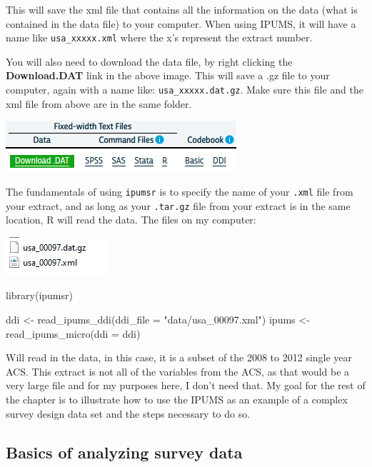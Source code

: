 \documentclass[
]{article}
\newenvironment{Shaded}{\begin{snugshade}}{\end{snugshade}}
\newcommand{\AttributeTok}[1]{\textcolor[rgb]{0.77,0.63,0.00}{#1}}
\newcommand{\FunctionTok}[1]{\textcolor[rgb]{0.00,0.00,0.00}{#1}}
\newcommand{\NormalTok}[1]{#1}
\newcommand{\OtherTok}[1]{\textcolor[rgb]{0.56,0.35,0.01}{#1}}
\newcommand{\StringTok}[1]{\textcolor[rgb]{0.31,0.60,0.02}{#1}}
\begin{document}
This will save the xml file that contains all the information on the data (what is contained in the data file) to your computer. When using IPUMS, it will have a name like \texttt{usa\_xxxxx.xml} where the x's represent the extract number.

You will also need to download the data file, by right clicking the \textbf{Download.DAT} link in the above image. This will save a .gz file to your computer, again with a name like: \texttt{usa\_xxxxx.dat.gz}. Make sure this file and the xml file from above are in the same folder.

\includegraphics{images/impum1.png}

The fundamentals of using \texttt{ipumsr} is to specify the name of your \texttt{.xml} file from your extract, and as long as your \texttt{.tar.gz} file from your extract is in the same location, R will read the data. The files on my computer:

\includegraphics{images/ipums_files.png}

\begin{Shaded}
\begin{Highlighting}[]
\FunctionTok{library}\NormalTok{(ipumsr)}

\NormalTok{ddi }\OtherTok{\textless{}{-}} \FunctionTok{read\_ipums\_ddi}\NormalTok{(}\AttributeTok{ddi\_file =} \StringTok{"data/usa\_00097.xml"}\NormalTok{)}
\NormalTok{ipums }\OtherTok{\textless{}{-}} \FunctionTok{read\_ipums\_micro}\NormalTok{(}\AttributeTok{ddi =}\NormalTok{ ddi)}
\end{Highlighting}
\end{Shaded}

Will read in the data, in this case, it is a subset of the 2008 to 2012 single year ACS. This extract is not all of the variables from the ACS, as that would be a very large file and for my purposes here, I don't need that. My goal for the rest of the chapter is to illustrate how to use the IPUMS as an example of a complex survey design data set and the steps necessary to do so.

\hypertarget{basics-of-analyzing-survey-data}{%
\subsection{Basics of analyzing survey data}\label{basics-of-analyzing-survey-data}}
\end{document}
